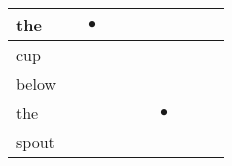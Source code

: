 \documentclass[landscape]{article}
\newcommand{\ssp}{\hspace{2pt}}
\newcommand{\mex}{\cellcolor{g}$\bullet$}
\begin{document}
\begin{tabular}{|l|p{10pt}|p{10pt}|p{10pt}|p{10pt}|p{10pt}|p{10pt}|p{10pt}|p{10pt}|p{10pt}|}
\hline
\ssp \cellcolor{ref1}the \ssp&\hspace{2pt}&\hspace{2pt}\mex&\hspace{2pt}&\hspace{2pt}&\hspace{2pt}&\hspace{2pt}&\hspace{2pt}&\hspace{2pt}&\hspace{2pt}\\
\hline
\ssp cup \ssp&\hspace{2pt}&\hspace{2pt}&\hspace{2pt}&\hspace{2pt}&\hspace{2pt}&\hspace{2pt}&\hspace{2pt}&\hspace{2pt}&\hspace{2pt}\\
\hline
\ssp below \ssp&\hspace{2pt}&\hspace{2pt}&\hspace{2pt}&\hspace{2pt}&\hspace{2pt}&\hspace{2pt}&\hspace{2pt}&\hspace{2pt}&\hspace{2pt}\\
\hline
\ssp \cellcolor{ref5}the \ssp&\hspace{2pt}&\hspace{2pt}&\hspace{2pt}&\hspace{2pt}&\hspace{2pt}&\hspace{2pt}\mex&\hspace{2pt}&\hspace{2pt}&\hspace{2pt}\\
\hline
\ssp spout \ssp&\hspace{2pt}&\hspace{2pt}&\hspace{2pt}&\hspace{2pt}&\hspace{2pt}&\hspace{2pt}&\hspace{2pt}&\hspace{2pt}&\hspace{2pt}\\

\end{tabular}
\end{document}
